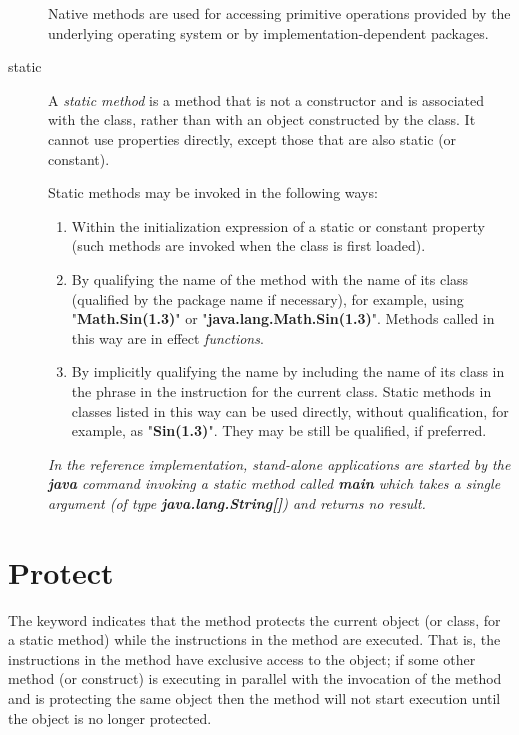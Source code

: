 \begin{description}
Native methods are used for accessing primitive operations provided by
the underlying operating system or by implementation-dependent packages.
\index{,}
\index{,}
\item[static]\label{refstatmet}

A \emph{static method} is a method that is not a constructor and is
associated with the class, rather than with an object constructed by the
class.
It cannot use properties directly, except those that are also static (or
constant).
 
Static methods may be invoked in the following ways:
\begin{enumerate}
\item Within the initialization expression of a static or constant
property (such methods are invoked when the class is first loaded).
\item By qualifying the name of the method with the name of its class
(qualified by the package name if necessary), for example, using
"\textbf{Math.Sin(1.3)}" or
"\textbf{java.lang.Math.Sin(1.3)}".
Methods called in this way are in effect \emph{functions}.
\item 
By implicitly qualifying the name by including the name of its class
in the  phrase in the  instruction for the
current class.  Static methods in classes listed in this way can be used
directly, without qualification, for example, as
"\textbf{Sin(1.3)}".
They may be still be qualified, if preferred.
\end{enumerate}
 \emph{In the reference implementation, stand-alone applications are
started by the \textbf{java} command invoking a static method
called \textbf{main} which takes a single argument (of
type \textbf{java.lang.String[]}) and returns no result.
}
\end{description}
\section{Protect}
 
The keyword  indicates that the method protects the
current object (or class, for a static method) while the instructions
in the method are executed.
That is, the instructions in the method have exclusive access to the
object; if some other method (or construct) is executing in
parallel with the invocation of the method and is protecting the same
object then the method will not start execution until the object is no
longer protected.
 

